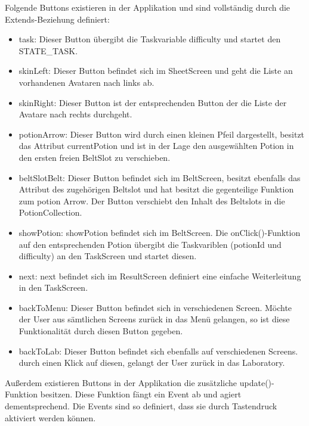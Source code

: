 Folgende Buttons existieren in der Applikation und sind vollst\"andig durch die Extends-Beziehung definiert:
\begin{itemize} 
	\item task: Dieser Button \"ubergibt die Taskvariable difficulty und startet den STATE\_TASK.
	\item skinLeft: Dieser Button befindet sich im SheetScreen und geht die Liste an vorhandenen Avataren nach links ab.
	\item skinRight: Dieser Button ist der entsprechenden Button der die Liste der Avatare nach rechts durchgeht.
	\item potionArrow: Dieser Button wird durch einen kleinen Pfeil dargestellt, besitzt das Attribut currentPotion und ist in der Lage den ausgew\"ahlten Potion in 
		den ersten freien BeltSlot zu verschieben.
	\item beltSlotBelt: Dieser Button befindet sich im BeltScreen, besitzt ebenfalls das Attribut des zugeh\"origen Beltslot und hat besitzt die gegenteilige Funktion zum 
		potion Arrow. Der Button verschiebt den Inhalt des Beltslots in die PotionCollection.
	\item showPotion: showPotion befindet sich im BeltScreen. Die onClick()-Funktion auf den entsprechenden Potion \"ubergibt die  Taskvariblen (potionId und 
		difficulty) an den TaskScreen und startet diesen.
	\item next: next befindet sich im ResultScreen definiert eine einfache Weiterleitung in den TaskScreen.
	\item backToMenu: Dieser Button befindet sich in verschiedenen Screen. M\"ochte der User aus s\"amtlichen Screens zur\"uck in das Men\"u gelangen, so ist
		diese Funktionalit\"at durch diesen Button gegeben.
	\item backToLab: Dieser Button befindet sich ebenfalls auf verschiedenen Screens. durch einen Klick auf diesen, gelangt der User zur\"uck in das Laboratory.
\end{itemize}     

Au{\ss}erdem existieren Buttons in der Applikation die zus\"atzliche update()-Funktion besitzen. Diese Funktion f\"angt ein Event ab und agiert dementsprechend.
Die Events sind so definiert, dass sie durch Tastendruck aktiviert werden k\"onnen.
 
